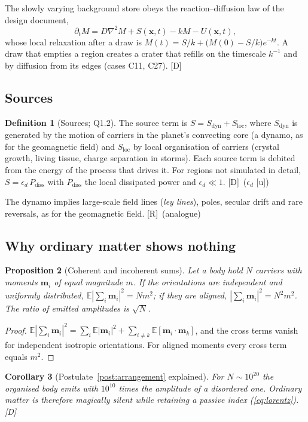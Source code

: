 \documentclass[11pt,a4paper]{article}
\numberwithin{equation}{section}
\theoremstyle{definition}
\newtheorem{definition}{Definition}[section]
\theoremstyle{plain}
\newtheorem{proposition}[definition]{Proposition}
\newtheorem{corollary}[definition]{Corollary}
\theoremstyle{remark}
\newcommand{\E}{\mathbb E}
\newcommand{\abs}[1]{\left\lvert #1\right\rvert}
\newcommand{\tagD}{\textcolor{tag}{\textsf{[D]}}}
\newcommand{\tagR}{\textcolor{tag}{\textsf{[R]}}}
\newcommand{\tagU}{\textcolor{tag}{\textsf{[u]}}}
\begin{document}
The slowly varying background store obeys the reaction--diffusion law of the design document,
\begin{equation}\label{eq:store}
\partial_t M = D\nabla^2 M + S(\bm x,t) - kM - U(\bm x,t),
\end{equation}
whose local relaxation after a draw is $M(t)=S/k+\big(M(0)-S/k\big)e^{-kt}$. A draw that empties a region creates a crater that refills on the timescale $k^{-1}$ and by diffusion from its edges (cases C11, C27). \tagD

\subsection{Sources}
\begin{definition}[Sources; Q1.2]\label{def:sources}
The source term is $S = S_{\text{dyn}} + S_{\text{loc}}$, where $S_{\text{dyn}}$ is generated by the motion of carriers in the planet's convecting core (a dynamo, as for the geomagnetic field) and $S_{\text{loc}}$ by local organisation of carriers (crystal growth, living tissue, charge separation in storms). Each source term is debited from the energy of the process that drives it. For regions not simulated in detail, $S = \epsilon_d\,P_{\text{diss}}$ with $P_{\text{diss}}$ the local dissipated power and $\epsilon_d\ll 1$. \tagD\ ($\epsilon_d$ \tagU)
\end{definition}
The dynamo implies large-scale field lines (\emph{ley lines}), poles, secular drift and rare reversals, as for the geomagnetic field. \tagR\ (analogue)

\subsection{Why ordinary matter shows nothing}
\begin{proposition}[Coherent and incoherent sums]\label{prop:coherence}
Let a body hold $N$ carriers with moments $\bm m_i$ of equal magnitude $m$. If the orientations are independent and uniformly distributed, $\E\abs{\sum_i \bm m_i}^2 = N m^2$; if they are aligned, $\abs{\sum_i\bm m_i}^2=N^2m^2$. The ratio of emitted amplitudes is $\sqrt N$.
\end{proposition}
\begin{proof}
$\E\abs{\sum_i\bm m_i}^2=\sum_i\E\abs{\bm m_i}^2+\sum_{i\ne k}\E[\bm m_i\cdot\bm m_k]$, and the cross terms vanish for independent isotropic orientations. For aligned moments every cross term equals $m^2$.
\end{proof}
\begin{corollary}[Postulate~\ref{post:arrangement} explained]
For $N\sim10^{20}$ the organised body emits with $10^{10}$ times the amplitude of a disordered one. Ordinary matter is therefore magically silent while retaining a passive index (\ref{eq:lorentz}). \tagD
\end{corollary}
\end{document}
